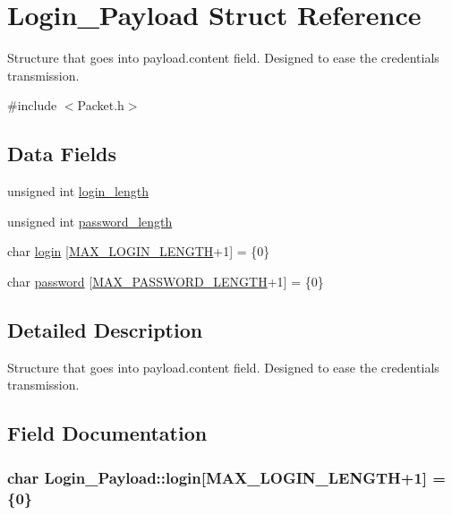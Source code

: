 \hypertarget{structLogin__Payload}{}\section{Login\+\_\+\+Payload Struct Reference}
\label{structLogin__Payload}


Structure that goes into payload.\+content field. Designed to ease the credentials transmission.  




{\ttfamily \#include $<$Packet.\+h$>$}

\subsection*{Data Fields}
\begin{DoxyCompactItemize}
\item 
unsigned int \hyperlink{structLogin__Payload_ae20d686a1176b58a1409a551dbbe539b}{login\+\_\+length}
\item 
unsigned int \hyperlink{structLogin__Payload_a376b903185f3e8bb7dc0bd5bd55ebff9}{password\+\_\+length}
\item 
char \hyperlink{structLogin__Payload_ab824929845f4f1c9efb55f5757062da2}{login} \mbox{[}\hyperlink{Packet_8h_ab9445e27830d28f1e288bd223ab95296}{M\+A\+X\+\_\+\+L\+O\+G\+I\+N\+\_\+\+L\+E\+N\+G\+TH}+1\mbox{]} = \{0\}
\item 
char \hyperlink{structLogin__Payload_aadc289041604b574892f1cdb966c7ca5}{password} \mbox{[}\hyperlink{Packet_8h_a7f264fafe78080f8ea68715854b9bc24}{M\+A\+X\+\_\+\+P\+A\+S\+S\+W\+O\+R\+D\+\_\+\+L\+E\+N\+G\+TH}+1\mbox{]} = \{0\}
\end{DoxyCompactItemize}


\subsection{Detailed Description}
Structure that goes into payload.\+content field. Designed to ease the credentials transmission. 

\subsection{Field Documentation}
\subsubsection[{\texorpdfstring{login}{login}}]{\setlength{\rightskip}{0pt plus 5cm}char Login\+\_\+\+Payload\+::login\mbox{[}{\bf M\+A\+X\+\_\+\+L\+O\+G\+I\+N\+\_\+\+L\+E\+N\+G\+TH}+1\mbox{]} = \{0\}}\hypertarget{structLogin__Payload_ab824929845f4f1c9efb55f5757062da2}{}\label{structLogin__Payload_ab824929845f4f1c9efb55f5757062da2}
